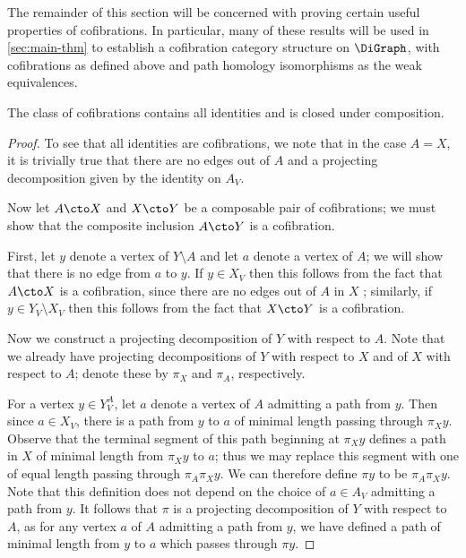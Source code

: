 The remainder of this section will be concerned with proving certain useful properties of cofibrations.
In particular, many of these results will be used in \cref{sec:main-thm} to establish a cofibration category structure on $\DiGraph$, with cofibrations as defined above and path homology isomorphisms as the weak equivalences.

\begin{proposition}\label{cof-wide-subcat}
The class of cofibrations contains all identities and is closed under composition.
\end{proposition}

\begin{proof}
To see that all identities are cofibrations, we note that in the case $A = X$, it is trivially true that there are no edges out of $A$ and a projecting decomposition given by the identity on $A_V$.

Now let $A \cto X$ and $X \cto Y$ be a composable pair of cofibrations; we must show that the composite inclusion $A \cto Y$ is a cofibration. 

First, let $y$ denote a vertex of $Y \setminus A$ and let $a$ denote a vertex of $A$; we will show that there is no edge from $a$ to $y$. If $y \in X_V$ then this follows from the fact that $A \cto X$ is a cofibration, since there are no edges out of $A$ in $X$
; similarly, if $y \in Y_V\setminus X_V$ then this follows from the fact that $X \cto Y$ is a cofibration. 

Now we construct a projecting decomposition of $Y$ with respect to $A$. Note that we already have projecting decompositions of $Y$ with respect to $X$ and of $X$ with respect to $A$; denote these by $\pi_X$ and $\pi_A$, respectively.

For a vertex $y \in Y_V^A$, let $a$ denote a vertex of $A$ admitting a path from $y$.
Then since $a \in X_V$, there is a path from $y$ to $a$ of minimal length passing through $\pi_X y$.
Observe that the terminal segment of this path beginning at $\pi_X y$ defines a path in $X$ of minimal length from $\pi_X y$ to $a$; thus we may replace this segment with one of equal length passing through $\pi_A \pi_X y$.
We can therefore define $\pi y$ to be $\pi_A \pi_X y$.
Note that this definition does not depend on the choice of $a \in A_V$ admitting a path from $y$.
It follows that $\pi$ is a projecting decomposition of $Y$ with respect to $A$, as for any vertex $a$ of $A$ admitting a path from $y$, we have defined a path of minimal length from $y$ to $a$ which passes through $\pi y$.
\end{proof}


